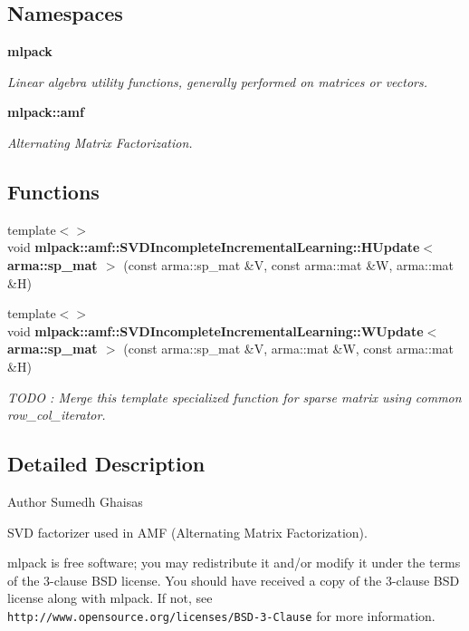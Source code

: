 \subsection*{Namespaces}
\begin{DoxyCompactItemize}
\item 
 {\bf mlpack}
\begin{DoxyCompactList}\small\item\em Linear algebra utility functions, generally performed on matrices or vectors. \end{DoxyCompactList}\item 
 {\bf mlpack\+::amf}
\begin{DoxyCompactList}\small\item\em Alternating Matrix Factorization. \end{DoxyCompactList}\end{DoxyCompactItemize}
\subsection*{Functions}
\begin{DoxyCompactItemize}
\item 
{\footnotesize template$<$$>$ }\\void {\bf mlpack\+::amf\+::\+S\+V\+D\+Incomplete\+Incremental\+Learning\+::\+H\+Update$<$ arma\+::sp\+\_\+mat $>$} (const arma\+::sp\+\_\+mat \&V, const arma\+::mat \&W, arma\+::mat \&H)
\item 
{\footnotesize template$<$$>$ }\\void {\bf mlpack\+::amf\+::\+S\+V\+D\+Incomplete\+Incremental\+Learning\+::\+W\+Update$<$ arma\+::sp\+\_\+mat $>$} (const arma\+::sp\+\_\+mat \&V, arma\+::mat \&W, const arma\+::mat \&H)
\begin{DoxyCompactList}\small\item\em T\+O\+DO \+: Merge this template specialized function for sparse matrix using common row\+\_\+col\+\_\+iterator. \end{DoxyCompactList}\end{DoxyCompactItemize}


\subsection{Detailed Description}
\begin{DoxyAuthor}{Author}
Sumedh Ghaisas
\end{DoxyAuthor}
S\+VD factorizer used in A\+MF (Alternating Matrix Factorization).

mlpack is free software; you may redistribute it and/or modify it under the terms of the 3-\/clause B\+SD license. You should have received a copy of the 3-\/clause B\+SD license along with mlpack. If not, see {\tt http\+://www.\+opensource.\+org/licenses/\+B\+S\+D-\/3-\/\+Clause} for more information. 